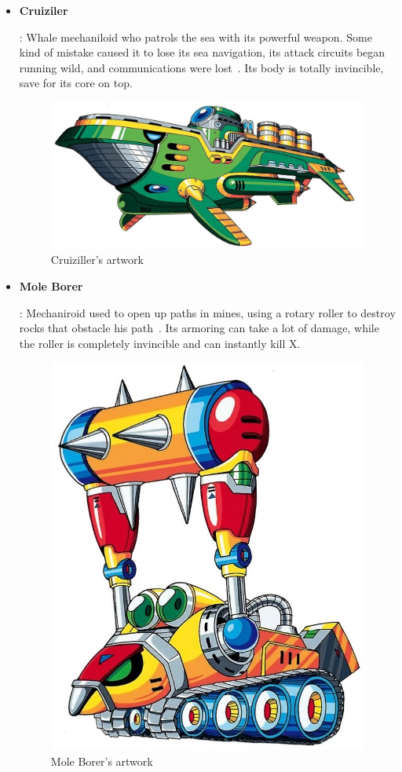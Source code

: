 \begin{itemize}
		\item%
		 \hypertarget{enem:Cruiziler}{\textbf{Cruiziler}}: Whale mechaniloid who patrols the sea with its powerful weapon. Some kind of mistake caused it to lose its sea navigation, its attack circuits began running wild, and communications were lost~\cite{wayback:X_resources}. Its body is totally invincible, save for its core on top.
		\begin{figure}[htp]
			\centering
			\includegraphics[width=0.6\linewidth]{figures/X1/enemies/Cruiziller.jpg}
			\caption{Cruiziller's artwork}
		\end{figure}
	
		\item \hypertarget{miniboss:Mole_Borer}{\textbf{Mole Borer}}:
		Mechaniroid used to open up paths in mines, using a 
		rotary roller to destroy rocks that obstacle his path~\cite{wayback:X_resources}. Its armoring can take a lot of damage, while the roller is completely invincible and can instantly kill X.
		\begin{figure}[htp]
			\centering
			\includegraphics[width=0.4\linewidth]{figures/X1/enemies/MoleBorer.jpg}
			\caption{Mole Borer's artwork}
		\end{figure}
	

\end{itemize}
